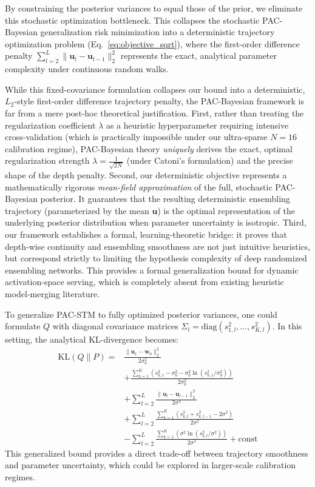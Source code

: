 By constraining the posterior variances to equal those of the prior, we eliminate this stochastic optimization bottleneck. This collapses the stochastic PAC-Bayesian generalization risk minimization into a deterministic trajectory optimization problem (Eq.~\ref{eq:objective_sqrt}), where the first-order difference penalty $\sum_{l=2}^L \|\mathbf{u}_l - \mathbf{u}_{l-1}\|_2^2$ represents the exact, analytical parameter complexity under continuous random walks. 

While this fixed-covariance formulation collapses our bound into a deterministic, $L_2$-style first-order difference trajectory penalty, the PAC-Bayesian framework is far from a mere post-hoc theoretical justification. 
First, rather than treating the regularization coefficient $\lambda$ as a heuristic hyperparameter requiring intensive cross-validation (which is practically impossible under our ultra-sparse $N=16$ calibration regime), PAC-Bayesian theory \emph{uniquely} derives the exact, optimal regularization strength $\lambda = \frac{1}{\sqrt{2N}}$ (under Catoni's formulation) and the precise shape of the depth penalty. 
Second, our deterministic objective represents a mathematically rigorous \emph{mean-field approximation} of the full, stochastic PAC-Bayesian posterior. It guarantees that the resulting deterministic ensembling trajectory (parameterized by the mean $\mathbf{u}$) is the optimal representation of the underlying posterior distribution when parameter uncertainty is isotropic. 
Third, our framework establishes a formal, learning-theoretic bridge: it proves that depth-wise continuity and ensembling smoothness are not just intuitive heuristics, but correspond strictly to limiting the hypothesis complexity of deep randomized ensembling networks. This provides a formal generalization bound for dynamic activation-space serving, which is completely absent from existing heuristic model-merging literature.

To generalize PAC-STM to fully optimized posterior variances, one could formulate $Q$ with diagonal covariance matrices $\Sigma_l = \text{diag}(s_{1, l}^2, \dots, s_{K, l}^2)$. In this setting, the analytical KL-divergence becomes:
\begin{align}
\text{KL}(Q \| P) = &\frac{\|\mathbf{u}_1 - \mathbf{w}_0\|_2^2}{2\sigma_0^2} \nonumber \\
&+ \frac{\sum_{k=1}^K (s_{k, 1}^2 - \sigma_0^2 - \sigma_0^2 \ln(s_{k, 1}^2 / \sigma_0^2))}{2\sigma_0^2} \nonumber \\
&+ \sum_{l=2}^L \frac{\|\mathbf{u}_l - \mathbf{u}_{l-1}\|_2^2}{2\sigma^2} \nonumber \\
&+ \sum_{l=2}^L \frac{\sum_{k=1}^K (s_{k, l}^2 + s_{k, l-1}^2 - 2\sigma^2)}{2\sigma^2} \nonumber \\
&- \sum_{l=2}^L \frac{\sum_{k=1}^K (\sigma^2 \ln(s_{k, l}^2 / \sigma^2))}{2\sigma^2} + \text{const}
\end{align}
This generalized bound provides a direct trade-off between trajectory smoothness and parameter uncertainty, which could be explored in larger-scale calibration regimes.
